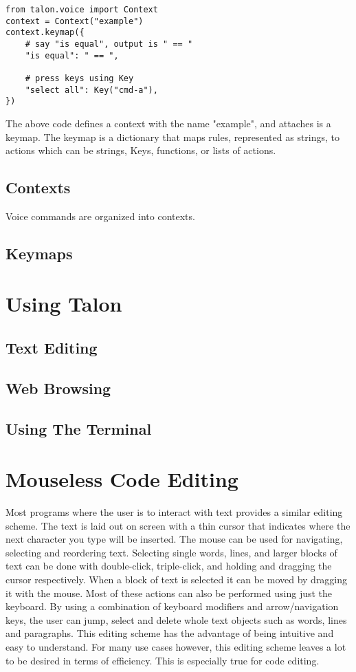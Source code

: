 \documentclass[a4paper,english]{ifimaster}
\begin{document}
\begin{verbatim}
from talon.voice import Context
context = Context("example")
context.keymap({
	# say "is equal", output is " == "
	"is equal": " == ",

	# press keys using Key
	"select all": Key("cmd-a"),
})
\end{verbatim}
The above code defines a context with the name "example", and attaches is a keymap.
The keymap is a dictionary that maps rules, represented as strings, to actions which can be strings, Keys, functions, or lists of actions.

\subsection{Contexts}
Voice commands are organized into contexts.

\subsection{Keymaps}


\section{Using Talon}
\subsection{Text Editing}
\subsection{Web Browsing}
\subsection{Using The Terminal}

\newpage
\section{Mouseless Code Editing}
Most programs where the user is to interact with text provides a similar editing scheme.
The text is laid out on screen with a thin cursor that indicates where the next character you type will be inserted.
The mouse can be used for navigating, selecting and reordering text.
Selecting single words, lines, and larger blocks of text can be done with double-click, triple-click, and holding and dragging the cursor respectively.
When a block of text is selected it can be moved by dragging it with the mouse.
Most of these actions can also be performed using just the keyboard.
By using a combination of keyboard modifiers and arrow/navigation keys, the user can jump, select and delete whole text objects such as words, lines and paragraphs.
This editing scheme has the advantage of being intuitive and easy to understand.
For many use cases however, this editing scheme leaves a lot to be desired in terms of efficiency.
This is especially true for code editing.
\end{document}
